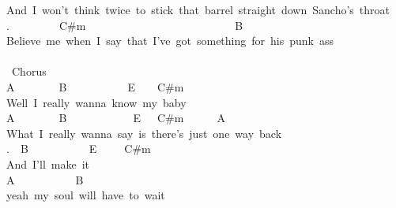 {And\ I\ won't\ think\ twice\ to\ stick\ that\ barrel\ straight\ down\ Sancho's\ throat\\
.\ \ \ \ \ \ \ \ \ C\#m\ \ \ \ \ \ \ \ \ \ \ \ \ \ \ \ \ \ \ \ \ \ \ \ \ \ \ B\ \\
Believe\ me\ when\ I\ say\ that\ I've\ got\ something\ for\ his\ punk\ ass\\
\\
\lbrack\ Chorus\rbrack\\
A\ \ \ \ \ \ \ \ B\ \ \ \ \ \ \ \ \ \ \ E\ \ \ \ C\#m\\
Well\ I\ really\ wanna\ know\ my\ baby\\
A\ \ \ \ \ \ \ \ B\ \ \ \ \ \ \ \ \ \ \ \ E\ \ \ C\#m\ \ \ \ \ \ A\\
What\ I\ really\ wanna\ say\ is\ there's\ just\ one\ way\ back\\
.\ \ B\ \ \ \ \ \ \ \ \ \ \ E\ \ \ \ \ C\#m\\
And\ I'll\ make\ it\\
A\ \ \ \ \ \ \ \ \ \ \ B\\
yeah\ my\ soul\ will\ have\ to\ wait\ }
